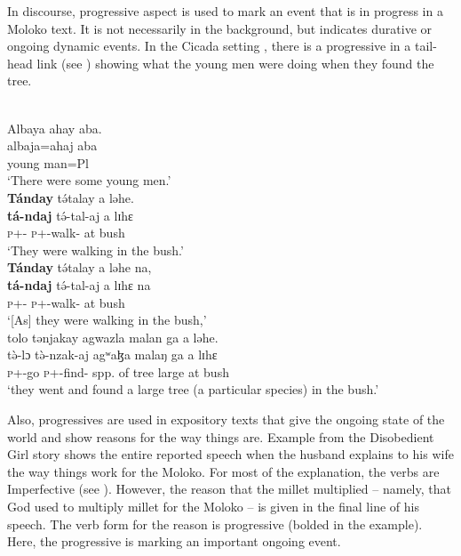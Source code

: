 In discourse, progressive aspect is used to mark an event that is in progress in a Moloko text. It is not necessarily in the background, but indicates durative or ongoing dynamic events. In the Cicada setting , there is a progressive in a tail-head link (see ) showing what the young men were doing when they found the tree. 

\ea \label{ex:8:28}\\
Albaya  ahay  aba.\\   
\gll  albaja=ahaj    aba\\
      {young man}=Pl     {\EXT}\\
\glt  ‘There were some young men.’\\
\medskip
\textbf{Tánday} t\'{ə}talay  a  ləhe. \\ 
\gll  \textbf{tá-ndaj} t\'{ə}-tal-aj a lɪhɛ\\
      \textsc{p}+{\IFV}-{\PRG} \textsc{p}+{\IFV}-walk{}-{\CL}  at    bush\\
\glt  ‘They were walking in the bush.’\\
\medskip
\textbf{Tánday}  t\'{ə}talay  a  ləhe  na, \\
\gll  \textbf{tá-ndaj} t\'{ə}-tal-aj a lɪhɛ na\\
      \textsc{p}+{\IFV}-{\PRG}   \textsc{p}+{\IFV}-walk{}-{\CL}  at   bush   {\PSP}\\
\glt  ‘[As] they were walking in the bush,’\\
\medskip
tolo  tənjakay  agwazla  malan  ga  a  ləhe.\\
\gll  t\`{ə}-lɔ t\`{ə}-nzak-aj agʷaɮa malaŋ ga a lɪhɛ\\
      \textsc{p}+{\PFV}-go  \textsc{p}+{\PFV}-find{}-{\CL}    {spp. of tree}      large   {\ADJ}    at    bush\\
\glt  ‘they went and found a large tree (a particular species) in the bush.’
\z

Also, progressives are used in expository texts that give the ongoing state of the world and show reasons for the way things are. Example  from the Disobedient Girl story shows the entire reported speech when the husband explains to his wife the way things work for the Moloko. For most of the explanation, the verbs are Imperfective (see ). However, the reason that the millet multiplied -- namely, that God used to multiply millet for the Moloko -- is given in the final line of his speech. The verb form for the reason is progressive (bolded in the example). Here, the progressive is marking an important ongoing event. 

